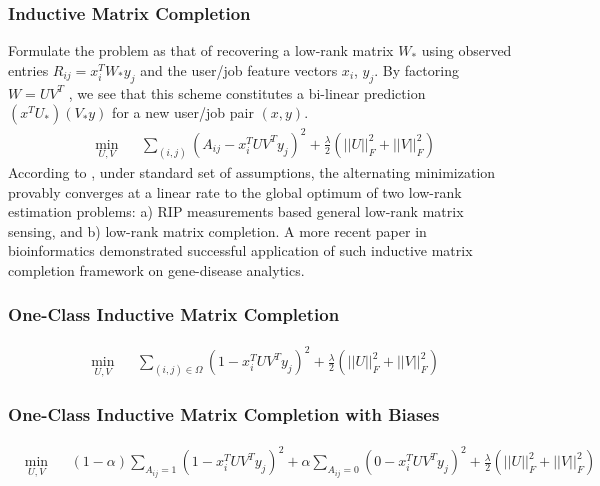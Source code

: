 \documentclass{article} %
\begin{document}
\subsubsection{Inductive Matrix Completion}
Formulate the problem as that of recovering a low-rank matrix $W_*$ using
observed entries $R_{ij} = x_i^T W_{*} y_j$ and the user/job feature vectors $x_i$, $y_j$. By
factoring $W = U V^T$ , we see that this scheme constitutes a bi-linear
prediction $(x^T U_{*})(V_{*} y)$ for a new user/job pair $(x, y)$.
\begin{equation}
    \begin{aligned}
        &\min_{U,V} &&\sum_{(i,j)} (A_{ij} - x_i^TUV^Ty_j)^2 
        + \frac{\lambda}{2}(||U||_F^2 + ||V||_F^2)
    \end{aligned}
\end{equation}
According to \cite{jain2013provable}, under standard set of assumptions,
the alternating minimization provably converges at a linear rate to the global
optimum of two low-rank estimation problems: a) RIP measurements based general
low-rank matrix sensing, and b) low-rank matrix completion. A more recent
paper \cite{natarajan2014inductive} in bioinformatics demonstrated successful
application of such inductive matrix completion
framework on gene-disease analytics.

\subsubsection{One-Class Inductive Matrix Completion}
\begin{equation}
    \begin{aligned}
        &\min_{U,V} &&\sum_{(i,j)\in\Omega} (1 - x_i^TUV^Ty_j)^2 
        + \frac{\lambda}{2}(||U||_F^2 + ||V||_F^2)
    \end{aligned}
\end{equation}

\subsubsection{One-Class Inductive Matrix Completion with Biases}
\begin{equation}
    \begin{aligned}
        &\min_{U,V} &&(1-\alpha) \sum_{A_{ij}=1} (1 - x_i^TUV^Ty_j)^2 +
        \alpha \sum_{A_{ij}=0} (0 - x_i^TUV^Ty_j)^2 + \frac{\lambda}{2}(||U||_F^2 + ||V||_F^2)
    \end{aligned}
\end{equation}
\end{document}
